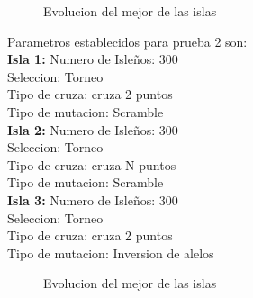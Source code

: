 \documentclass[10pt,letterpaper]{article}
\begin{document}
\begin{figure}[H]
      \begin{center}
        \caption{Evolucion del mejor de las islas}
        \label{Patron de señales para reconocimiento de señal Gaussiana}
      \end{center}
    \end{figure}

Parametros establecidos para prueba 2 son:
\\
\textbf{Isla 1:} Numero de Isleños: 300\\
Seleccion: Torneo\\ 
Tipo de cruza: cruza 2 puntos\\
Tipo de mutacion: Scramble\\
\textbf{Isla 2:} Numero de Isleños: 300\\
Seleccion: Torneo\\ 
Tipo de cruza: cruza N puntos\\
Tipo de mutacion: Scramble\\
\textbf{Isla 3:} Numero de Isleños: 300\\
Seleccion: Torneo\\ 
Tipo de cruza: cruza 2 puntos\\
Tipo de mutacion: Inversion de alelos

\begin{figure}[H]
      \begin{center}
        \caption{Evolucion del mejor de las islas}
        \label{Patron de señales para reconocimiento de señal Gaussiana}
      \end{center}
    \end{figure}
\end{document}
